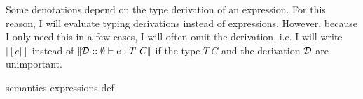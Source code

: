 \begin{defbox}
Some denotations depend on the type derivation of an expression. For this reason, I will evaluate typing derivations instead of expressions. However, because I only need this in a few cases, I will often omit the derivation, i.e. I will write $|[e|]$ instead of $|[\mathcal{D} :: \emptyset |- e : T\ C|]$ if the type $T\ C$ and the derivation $\mathcal{D}$ are unimportant.

{semantics-expressions-def}
\end{defbox}
